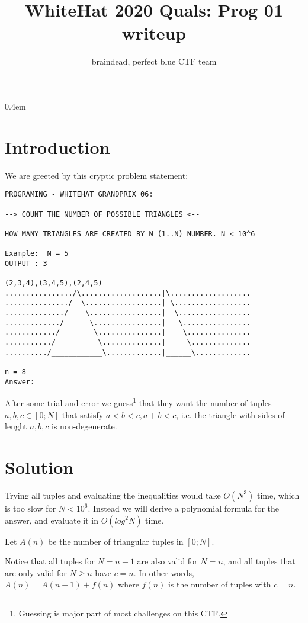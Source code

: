 \documentclass{article}
\title{WhiteHat 2020 Quals: Prog 01 writeup}
\author{braindead, perfect blue CTF team}
\begin{document}
\parindent 0pt
\parskip 0.4em
\maketitle
\newcommand{\G}[0]{\mathrm{G}}
\newcommand{\Half}[0]{\floor*{\frac{n}{2}}}
\DeclarePairedDelimiter\ceil{\lceil}{\rceil}
\DeclarePairedDelimiter\floor{\lfloor}{\rfloor}

\section{Introduction}

We are greeted by this cryptic problem statement:
\begin{verbatim}
PROGRAMING - WHITEHAT GRANDPRIX 06:

--> COUNT THE NUMBER OF POSSIBLE TRIANGLES <--

HOW MANY TRIANGLES ARE CREATED BY N (1..N) NUMBER. N < 10^6

Example:  N = 5
OUTPUT : 3 

(2,3,4),(3,4,5),(2,4,5)
................/\...................|\...................
.............../  \..................| \..................
............../    \.................|  \.................
............./      \................|   \................
............/        \...............|    \...............
.........../          \..............|     \..............
........../____________\.............|______\.............
	
n = 8
Answer:
\end{verbatim}

After some trial and error we guess\footnote{Guessing is major part of most challenges on this CTF.}
that they want the number of tuples $a, b, c \in [0; N]$ that satisfy $a < b < c, a+b < c$, i.e.
the triangle with sides of lenght $a, b, c$ is non-degenerate.

\section{Solution}

Trying all tuples and evaluating the inequalities would take $O(N^3)$ time, which is too slow for $N < 10^6$.
Instead we will derive a polynomial formula for the answer, and evaluate it in $O(log^2 N)$ time.

Let $A(n)$ be the number of triangular tuples in $[0; N]$.

Notice that all tuples for $N = n-1$ are also valid for $N = n$,
and all tuples that are only valid for $N \geq n$ have $c = n$.
In other words, $A(n) = A(n-1) + f(n)$ where $f(n)$ is the number of
tuples with $c = n$.
\end{document}
